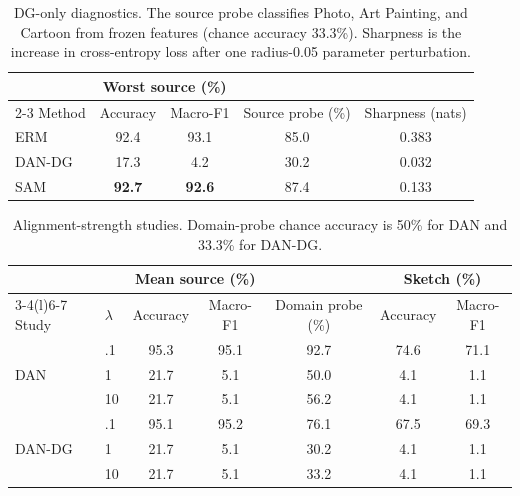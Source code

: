 \documentclass{article}
\newcommand{\best}[1]{\textbf{#1}}
\begin{document}
\begin{table}[H]
\caption{DG-only diagnostics. The source probe classifies Photo, Art Painting, and Cartoon from frozen features (chance accuracy 33.3\%). Sharpness is the increase in cross-entropy loss after one radius-0.05 parameter perturbation.}
\label{tab:dgdiagnostics}\centering\scriptsize
\begin{tabular}{@{}lcccc@{}}
\toprule
& \multicolumn{2}{c}{Worst source (\%)} & & \\
\cmidrule(lr){2-3}
Method & Accuracy & Macro-F1 & Source probe (\%) & Sharpness (nats)\\
\midrule
ERM & 92.4 & 93.1 & 85.0 & 0.383\\
DAN-DG & 17.3 & 4.2 & 30.2 & 0.032\\
SAM & \best{92.7} & \best{92.6} & 87.4 & 0.133\\
\bottomrule
\end{tabular}
\end{table}

\begin{table}[H]
\caption{Alignment-strength studies. Domain-probe chance accuracy is 50\% for DAN and 33.3\% for DAN-DG.}
\label{tab:control}\centering\scriptsize
\begin{tabular}{@{}llccccc@{}}
\toprule
& & \multicolumn{2}{c}{Mean source (\%)} & & \multicolumn{2}{c}{Sketch (\%)}\\
\cmidrule(lr){3-4}\cmidrule(l){6-7}
Study & $\lambda$ & Accuracy & Macro-F1 & Domain probe (\%) & Accuracy & Macro-F1\\
\midrule
\multirow{3}{*}{DAN} & .1 & 95.3 & 95.1 & 92.7 & 74.6 & 71.1\\
& 1 & 21.7 & 5.1 & 50.0 & 4.1 & 1.1\\
& 10 & 21.7 & 5.1 & 56.2 & 4.1 & 1.1\\
\midrule
\multirow{3}{*}{DAN-DG} & .1 & 95.1 & 95.2 & 76.1 & 67.5 & 69.3\\
& 1 & 21.7 & 5.1 & 30.2 & 4.1 & 1.1\\
& 10 & 21.7 & 5.1 & 33.2 & 4.1 & 1.1\\
\bottomrule
\end{tabular}
\end{table}

\FloatBarrier
\end{document}
